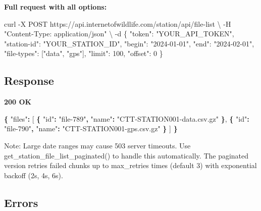 \documentclass[
]{book}
\newenvironment{Shaded}{\begin{snugshade}}{\end{snugshade}}
\newcommand{\AttributeTok}[1]{\textcolor[rgb]{0.13,0.29,0.53}{#1}}
\newcommand{\DataTypeTok}[1]{\textcolor[rgb]{0.13,0.29,0.53}{#1}}
\newcommand{\ExtensionTok}[1]{#1}
\newcommand{\FunctionTok}[1]{\textcolor[rgb]{0.13,0.29,0.53}{\textbf{#1}}}
\newcommand{\NormalTok}[1]{#1}
\newcommand{\OtherTok}[1]{\textcolor[rgb]{0.56,0.35,0.01}{#1}}
\newcommand{\StringTok}[1]{\textcolor[rgb]{0.31,0.60,0.02}{#1}}
\begin{document}
\textbf{Full request with all options:}

\begin{Shaded}
\begin{Highlighting}[]
\ExtensionTok{curl} \AttributeTok{{-}X}\NormalTok{ POST https://api.internetofwildlife.com/station/api/file{-}list }\DataTypeTok{\textbackslash{}}
  \AttributeTok{{-}H} \StringTok{"Content{-}Type: application/json"} \DataTypeTok{\textbackslash{}}
  \AttributeTok{{-}d} \StringTok{\textquotesingle{}\{}
\StringTok{    "token": "YOUR\_API\_TOKEN",}
\StringTok{    "station{-}id": "YOUR\_STATION\_ID",}
\StringTok{    "begin": "2024{-}01{-}01",}
\StringTok{    "end": "2024{-}02{-}01",}
\StringTok{    "file{-}types": ["data", "gps"],}
\StringTok{    "limit": 100,}
\StringTok{    "offset": 0}
\StringTok{  \}\textquotesingle{}}
\end{Highlighting}
\end{Shaded}

\subsection{Response}\label{response-2}

\textbf{200 OK}

\begin{Shaded}
\begin{Highlighting}[]
\FunctionTok{\{}
  \DataTypeTok{"files"}\FunctionTok{:} \OtherTok{[}
    \FunctionTok{\{}
      \DataTypeTok{"id"}\FunctionTok{:} \StringTok{"file{-}789"}\FunctionTok{,}
      \DataTypeTok{"name"}\FunctionTok{:} \StringTok{"CTT{-}STATION001{-}data.csv.gz"}
    \FunctionTok{\}}\OtherTok{,}
    \FunctionTok{\{}
      \DataTypeTok{"id"}\FunctionTok{:} \StringTok{"file{-}790"}\FunctionTok{,}
      \DataTypeTok{"name"}\FunctionTok{:} \StringTok{"CTT{-}STATION001{-}gps.csv.gz"}
    \FunctionTok{\}}
  \OtherTok{]}
\FunctionTok{\}}
\end{Highlighting}
\end{Shaded}

Note: Large date ranges may cause 503 server timeouts. Use get\_station\_file\_list\_paginated() to handle this automatically. The paginated version retries failed chunks up to max\_retries times (default 3) with exponential backoff (2s, 4s, 6s).

\subsection{Errors}\label{errors-2}
\end{document}
